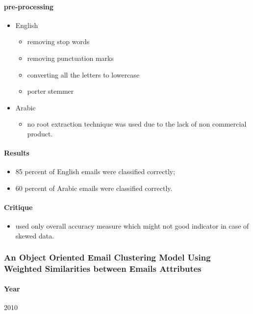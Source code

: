 \documentclass[12pt]{article}
\begin{document}
\paragraph{pre-processing}
\begin{itemize}
    \item English
    \begin{itemize}
        \item removing stop words
        \item removing punctuation marks
        \item converting all the letters to lowercase
        \item porter stemmer
    \end{itemize}
    \item Arabic
    \begin{itemize}
        \item no root extraction technique was used due to the lack of non commercial product.
    \end{itemize}
\end{itemize}

\paragraph{Results}
\begin{itemize}
    \item 85 percent of English emails were classified correctly;
    \item 60 percent of Arabic emails were classified correctly.
\end{itemize}

\paragraph{Critique}
\begin{itemize}
    \item used only overall accuracy measure which might not good indicator in case of skewed data.
\end{itemize}


\subsubsection{An Object Oriented Email Clustering Model Using Weighted Similarities between Emails Attributes}
\paragraph{Year} 2010
\end{document}
